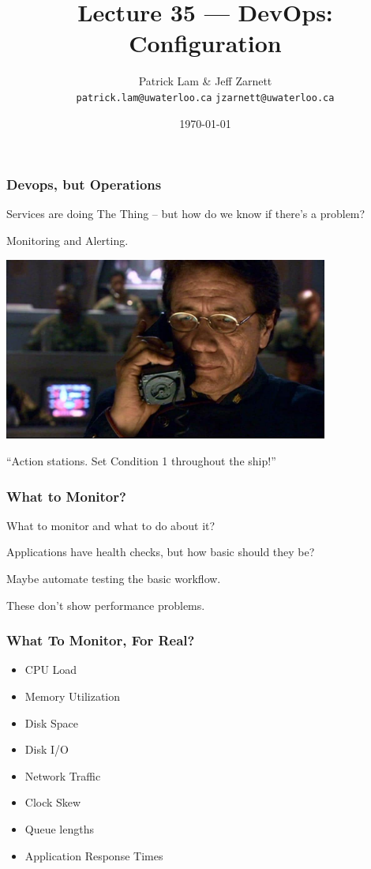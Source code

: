 

\title{Lecture 35 --- DevOps: Configuration }

\author{Patrick Lam \& Jeff Zarnett \\ \small \texttt{patrick.lam@uwaterloo.ca} \texttt{jzarnett@uwaterloo.ca}}
\date{\today}




\begin{frame}
  \titlepage

 \end{frame}


\begin{frame}
\frametitle{Devops, but Operations}

Services are doing The Thing -- but how do we know if there's a problem?

Monitoring and Alerting.

\begin{center}
	\includegraphics[width=0.8\textwidth]{images/adama.jpg}
\end{center}
``Action stations. Set Condition 1 throughout the ship!''
\end{frame}


\begin{frame}
\frametitle{What to Monitor?}

What to monitor and what to do about it?

Applications have health checks, but how basic should they be?

Maybe automate testing the basic workflow.

These don't show performance problems.

\end{frame}


\begin{frame}
\frametitle{What To Monitor, For Real?}


\begin{itemize}
	\item CPU Load
	\item Memory Utilization
	\item Disk Space
	\item Disk I/O
	\item Network Traffic
	\item Clock Skew
	\item Queue lengths
	\item Application Response Times
\end{itemize}

\end{frame}


